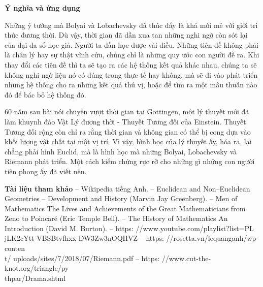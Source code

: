 \begin{multicols}{2}
	\textbf{\color{lichsutoanhoc}Ý nghĩa và ứng dụng}
	
	Những ý tưởng mà Bolyai và Lobachevsky đã thúc đẩy là khá mới mẻ với giới tri thức đương thời. Dù vậy, thời gian đã dần xua tan những nghi ngờ còn sót lại của đại đa số học giả. Người ta dần học được vài điều. Những tiên đề không phải là chân lý hay sự thật vĩnh cửu, chúng chỉ là những quy ước con người đề ra. Khi thay đổi các tiên đề thì ta sẽ tạo ra các hệ thống kết quả khác nhau, chúng ta sẽ không nghi ngờ liệu nó có đúng trong thực tế hay không, mà sẽ đi vào phát triển những hệ thống cho ra những kết quả thú vị, hoặc để tìm ra một mâu thuẫn nào đó để bác bỏ hệ thống đó.
	
	60 năm sau bài nói chuyện vượt thời gian tại Gottingen, một lý thuyết mới đã làm khuynh đảo Vật Lý đương thời - Thuyết Tương đối của Einstein. Thuyết Tương đối rộng còn chỉ ra rằng thời gian và không gian có thể bị cong dựa vào khối lượng vật chất tại một vị trí. Vì vậy, hình học của lý thuyết ấy, hóa ra, lại chẳng phải hình Euclid, mà là hình học mà những Bolyai, Lobachevsky và Riemann phát triển. Một cách kiểm chứng rực rỡ cho những gì những con người tiên phong ấy đã viết nên.
		
		
	\vskip 0.1cm
	\textbf{\color{lichsutoanhoc}\color{lichsutoanhoc}Tài liệu tham khảo}
	\vskip 0.1cm
	-- Wikipedia tiếng Anh.
	\vskip 0.1cm
	-- Euclidean and Non--Euclidean Geometries -- Development and History (Marvin Jay Greenberg).
	\vskip 0.1cm
	-- Men of Mathematics The Lives and Achievements of the Great Mathematicians from Zeno to Poincaré (Eric Temple Bell).
	\vskip 0.1cm
	-- The History of Mathematics An Introduction (David M. Burton).
	\vskip 0.1cm
	-- https: //www.youtube.com/playlist?list=PL\\jLK2cYtt-VBSBtvfhxx-DW3Zw3nOQHVZ
	\vskip 0.1cm
	-- https: //rosetta.vn/lequanganh/wp-conten\\t/
	uploads/sites/7/2018/07/Riemann.pdf
	\vskip 0.1cm
	-- https: //www.cut-the-knot.org/triangle/py\\
	thpar/Drama.shtml
\end{multicols}